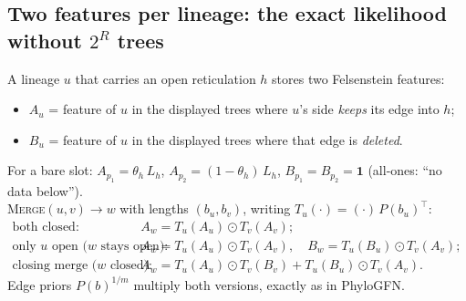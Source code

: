 \subsection{Two features per lineage: the exact likelihood without $2^R$ trees}
\begin{keybox}
A lineage $u$ that carries an open reticulation $h$ stores two Felsenstein features:
\begin{itemize}[nosep]
\item $A_u$ = feature of $u$ in the displayed trees where $u$'s side \emph{keeps} its edge into $h$;
\item $B_u$ = feature of $u$ in the displayed trees where that edge is \emph{deleted}.
\end{itemize}
For a bare slot: $A_{p_1}=\theta_h\,L_h$, $A_{p_2}=(1-\theta_h)\,L_h$, $B_{p_1}=B_{p_2}=\mathbf 1$ (all-ones: ``no data below'').\\
\textsc{Merge}$(u,v)\to w$ with lengths $(b_u,b_v)$, writing $T_u(\cdot)=(\cdot)\,P(b_u)^{\!\top}$:
{\small\begin{align*}
\text{both closed:}\ & A_w=T_u(A_u)\odot T_v(A_v);\\
\text{only $u$ open ($w$ stays open):}\ & A_w=T_u(A_u)\odot T_v(A_v),\quad B_w=T_u(B_u)\odot T_v(A_v);\\
\text{closing merge ($w$ closed):}\ & A_w=T_u(A_u)\odot T_v(B_v)+T_u(B_u)\odot T_v(A_v).
\end{align*}}
Edge priors $P(b)^{1/m}$ multiply both versions, exactly as in PhyloGFN.
\end{keybox}

